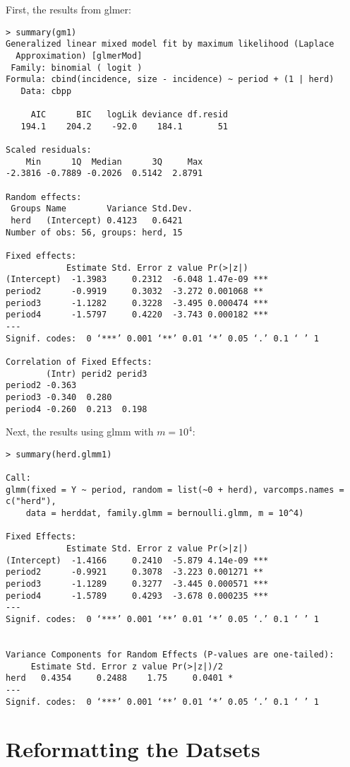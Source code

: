 \documentclass{article}
\begin{document}
First, the results from glmer:
\begin{verbatim}
> summary(gm1)
Generalized linear mixed model fit by maximum likelihood (Laplace
  Approximation) [glmerMod]
 Family: binomial ( logit )
Formula: cbind(incidence, size - incidence) ~ period + (1 | herd)
   Data: cbpp

     AIC      BIC   logLik deviance df.resid 
   194.1    204.2    -92.0    184.1       51 

Scaled residuals: 
    Min      1Q  Median      3Q     Max 
-2.3816 -0.7889 -0.2026  0.5142  2.8791 

Random effects:
 Groups Name        Variance Std.Dev.
 herd   (Intercept) 0.4123   0.6421  
Number of obs: 56, groups: herd, 15

Fixed effects:
            Estimate Std. Error z value Pr(>|z|)    
(Intercept)  -1.3983     0.2312  -6.048 1.47e-09 ***
period2      -0.9919     0.3032  -3.272 0.001068 ** 
period3      -1.1282     0.3228  -3.495 0.000474 ***
period4      -1.5797     0.4220  -3.743 0.000182 ***
---
Signif. codes:  0 ‘***’ 0.001 ‘**’ 0.01 ‘*’ 0.05 ‘.’ 0.1 ‘ ’ 1

Correlation of Fixed Effects:
        (Intr) perid2 perid3
period2 -0.363              
period3 -0.340  0.280       
period4 -0.260  0.213  0.198

\end{verbatim}

Next, the results using glmm with $m=10^4$:
\begin{verbatim}
> summary(herd.glmm1)

Call:
glmm(fixed = Y ~ period, random = list(~0 + herd), varcomps.names = c("herd"), 
    data = herddat, family.glmm = bernoulli.glmm, m = 10^4)

Fixed Effects:
            Estimate Std. Error z value Pr(>|z|)    
(Intercept)  -1.4166     0.2410  -5.879 4.14e-09 ***
period2      -0.9921     0.3078  -3.223 0.001271 ** 
period3      -1.1289     0.3277  -3.445 0.000571 ***
period4      -1.5789     0.4293  -3.678 0.000235 ***
---
Signif. codes:  0 ‘***’ 0.001 ‘**’ 0.01 ‘*’ 0.05 ‘.’ 0.1 ‘ ’ 1


Variance Components for Random Effects (P-values are one-tailed):
     Estimate Std. Error z value Pr(>|z|)/2  
herd   0.4354     0.2488    1.75     0.0401 *
---
Signif. codes:  0 ‘***’ 0.001 ‘**’ 0.01 ‘*’ 0.05 ‘.’ 0.1 ‘ ’ 1

\end{verbatim}

\section{Reformatting the Datsets}
\end{document}
